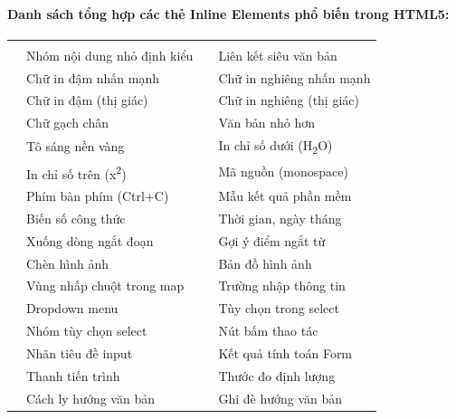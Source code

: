 \paragraph{Danh sách tổng hợp các thẻ Inline Elements phổ biến trong HTML5:}
\begin{prettyTableBox}
\begin{tabularx}{\linewidth}{K{1.8cm} Z K{1.8cm} Z}
 &  &  &  \\
 & Nhóm nội dung nhỏ định kiểu &  & Liên kết siêu văn bản \\
 & Chữ in đậm nhấn mạnh &  & Chữ in nghiêng nhấn mạnh \\
 & Chữ in đậm (thị giác) &  & Chữ in nghiêng (thị giác) \\
 & Chữ gạch chân &  & Văn bản nhỏ hơn \\
 & Tô sáng nền vàng &  & In chỉ số dưới (H\textsubscript{2}O) \\
 & In chỉ số trên (x\textsuperscript{2}) &  & Mã nguồn (monospace) \\
 & Phím bàn phím (Ctrl+C) &  & Mẫu kết quả phần mềm \\
 & Biến số công thức &  & Thời gian, ngày tháng \\
 & Xuống dòng ngắt đoạn &  & Gợi ý điểm ngắt từ \\
 & Chèn hình ảnh &  & Bản đồ hình ảnh \\
 & Vùng nhấp chuột trong map &  & Trường nhập thông tin \\
 & Dropdown menu &  & Tùy chọn trong select \\
 & Nhóm tùy chọn select &  & Nút bấm thao tác \\
 & Nhãn tiêu đề input &  & Kết quả tính toán Form \\
 & Thanh tiến trình &  & Thước đo định lượng \\
 & Cách ly hướng văn bản &  & Ghi đè hướng văn bản \\
\end{tabularx}
\end{prettyTableBox}

